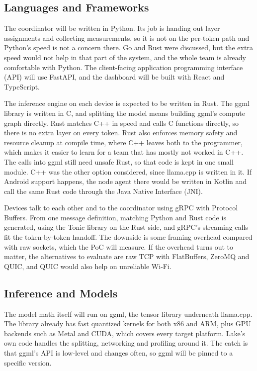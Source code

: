 \documentclass{article}
\begin{document}
\subsection{Languages and Frameworks}

The coordinator will be written in Python. Its job is handing out layer
assignments and collecting measurements, so it is not on the per-token path
and Python's speed is not a concern there. Go and Rust were discussed, but the
extra speed would not help in that part of the system, and the whole team is
already comfortable with Python. The client-facing application programming
interface (API) will use FastAPI, and the dashboard will be built with React
and TypeScript.

The inference engine on each device is expected to be written in Rust. The
ggml library is written in C, and splitting the model means building ggml's
compute graph directly. Rust matches C++ in speed and calls C functions
directly, so there is no extra layer on every token. Rust also enforces memory
safety and resource cleanup at compile time, where C++ leaves both to the
programmer, which makes it easier to learn for a team that has mostly not
worked in C++. The calls into ggml still need unsafe Rust, so that code is kept
in one small module. C++ was the other option considered, since llama.cpp is
written in it. If Android support happens, the node agent there would be
written in Kotlin and call the same Rust code through the Java Native
Interface (JNI).

Devices talk to each other and to the coordinator using gRPC with Protocol
Buffers. From one message definition, matching Python and Rust code is
generated, using the Tonic library on the Rust side, and gRPC's streaming calls
fit the token-by-token handoff. The downside is
some framing overhead compared with raw sockets, which the PoC will measure.
If the overhead turns out to matter, the alternatives to evaluate are raw TCP
with FlatBuffers, ZeroMQ and QUIC, and QUIC would also help on unreliable
Wi-Fi.

\subsection{Inference and Models}

The model math itself will run on ggml, the tensor library underneath
llama.cpp. The library already has fast quantized kernels for both x86 and
ARM, plus GPU backends such as Metal and CUDA, which covers every target
platform. Lake's own code handles the splitting, networking and profiling
around it. The catch is that ggml's API is low-level and changes often, so
ggml will be pinned to a specific version.
\end{document}
